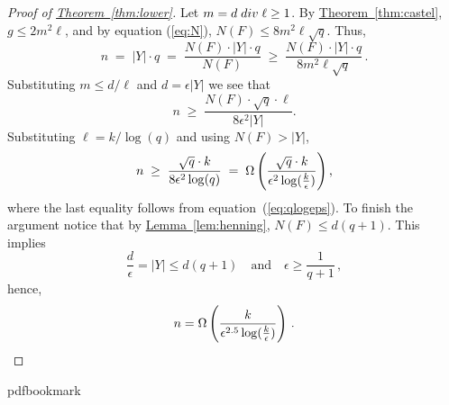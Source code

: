 \documentclass[10pt]{article}
\theoremstyle{definition}
\numberwithin{equation}{section}
\newcommand{\expref}[2]{\texorpdfstring{\hyperref[#2]{#1~\ref{#2}}}{#1~\ref{#2}}}
\newcommand{\eps}{\epsilon}
\newcommand{\logepsk}{\log({k \over \epsilon})}
\renewcommand{\div}{{\rm div}}
\begin{document}
\begin{proof}[Proof of \expref{Theorem}{thm:lower}]
Let $m = d \;\div\; \ell \ge 1$. By \expref{Theorem}{thm:castel}, $g \le
2m^2 \ell$, and by equation (\ref{eq:N}), $N(F) \le 8m^2 \ell \sqrt{q}$.
Thus,
\begin{equation*}
n \;=\; |Y| \cdot q \;=\; \frac{N(F) \cdot |Y| \cdot q}{N(F)} \;\ge\;
\frac{N(F) \cdot |Y| \cdot q}{8m^2 \ell \sqrt{q}}\,.
\end{equation*}
Substituting $m \le d/\ell$ and $d=\eps |Y|$ we see that
\begin{equation*}
n \;\ge\;  \frac{N(F) \cdot \sqrt{q} \cdot \ell}{8 \eps^2 |Y|}.
\end{equation*}
Substituting $\ell = {k}/{\log(q)}$ and using $N(F) > |Y|$,
\begin{equation*}
n\;\ge\;  \frac{\sqrt{q} \cdot k}{8 \eps^2 \log (q)} \;=\;
\Omega\left(\frac{\sqrt{q} \cdot k}{\eps^2 \logepsk}\right),
\end{equation*}
where the last equality follows from equation~(\ref{eq:qlogeps}). To
finish the argument notice that by \expref{Lemma}{lem:henning}, $N(F)
\le d(q+1)$. This implies
\[
\frac{d}{\eps} =|Y| \le d(q+1)\quad \text{and} \quad \eps
\ge \frac{1}{q+1}\,,\]
hence,
\[
n =\Omega\left( \frac{k}{\eps^{2.5}
\logepsk}\right)\,.\qedhere
\]
\end{proof}

\begingroup\raggedright
%
%
%
%
%
\providecommand{\bibhead}[1]{}
%
\expandafter\ifx\csname pdfbookmark\endcsname\relax%
  \providecommand{\tocrefpdfbookmark}{}
\else\providecommand{\tocrefpdfbookmark}{%
   \hypertarget{tocreferences}{}%
   \pdfbookmark[1]{References}{tocreferences}}%
\fi
\end{document}
